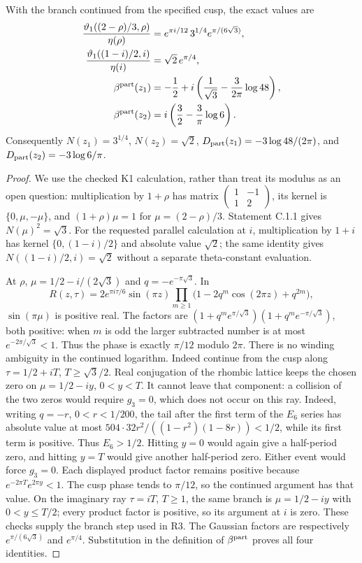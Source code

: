 \begin{proposition}\label{ari:C.1.2}
With the branch continued from the specified cusp, the exact values are
\begin{align*}
 \frac{\vartheta _1((2-\rho)/3,\rho)}{\eta(\rho)}
   &=e^{\pi i/12}\,3^{1/4}e^{\pi/(6\sqrt3)},\\
 \frac{\vartheta _1((1-i)/2,i)}{\eta(i)}
   &=\sqrt2\,e^{\pi/4},\\
 \beta^{\rm part}(z_1)
   &=-\frac12+i\left(\frac1{\sqrt3}-\frac3{2\pi}\log48\right),\\
 \beta^{\rm part}(z_2)
   &=i\left(\frac32-\frac3\pi\log6\right).
\end{align*}
Consequently $N(z_1)=3^{1/4}$, $N(z_2)=\sqrt2$,
$D_{\rm part}(z_1)=-3\log48/(2\pi)$, and
$D_{\rm part}(z_2)=-3\log6/\pi$.
\end{proposition}
\begin{proof}
We use the checked K1 calculation, rather than treat its modulus as an
open question: multiplication by $1+\rho$ has matrix
$\left(\begin{smallmatrix}1&-1\\1&2\end{smallmatrix}\right)$,
its kernel is $\{0,\mu,-\mu\}$, and $(1+\rho)\mu=1$ for
$\mu=(2-\rho)/3$. Statement C.1.1 gives $N(\mu)^2=\sqrt3$.
For the requested parallel calculation at $i$, multiplication by $1+i$
has kernel $\{0,(1-i)/2\}$ and absolute value $\sqrt2$; the same
identity gives $N((1-i)/2,i)=\sqrt2$ without a separate theta-constant
evaluation.

At $\rho$, $\mu=1/2-i/(2\sqrt3)$ and $q=-e^{-\pi\sqrt3}$. In
\[
 R(z,\tau)=2e^{\pi i\tau/6}\sin(\pi z)
 \prod_{m\ge1}\bigl(1-2q^m\cos(2\pi z)+q^{2m}\bigr),
\]
$\sin(\pi\mu)$ is positive real. The factors are
$(1+q^m e^{\pi/\sqrt3})(1+q^m e^{-\pi/\sqrt3})$, both positive:
when $m$ is odd the larger subtracted number is at most
$e^{-2\pi/\sqrt3}<1$. Thus the phase is exactly $\pi/12$ modulo
$2\pi$. There is no winding ambiguity in the continued logarithm.
Indeed continue from the cusp along $\tau=1/2+iT$,
$T\ge\sqrt3/2$. Real conjugation of the rhombic lattice keeps the
chosen zero on $\mu=1/2-iy$, $0<y<T$. It cannot leave that component:
a collision of the two zeros would require $g_3=0$, which does not
occur on this ray. Indeed, writing $q=-r$, $0<r<1/200$,
the tail after the first term of the $E_6$ series has absolute value
at most $504\cdot32r^2/((1-r^2)(1-8r))<1/2$, while its
first term is positive. Thus $E_6>1/2$. Hitting $y=0$ would again give a half-period zero, and
hitting $y=T$ would give another half-period zero. Either event
would force $g_3=0$. Each displayed product factor remains
positive because $e^{-2\pi T}e^{2\pi y}<1$. The cusp phase tends to
$\pi/12$, so the continued argument has that value. On the imaginary
ray $\tau=iT$, $T\ge1$, the same branch is
$\mu=1/2-iy$ with $0<y\le T/2$; every product factor is positive,
so its argument at $i$ is zero. These checks supply the branch step
used in R3. The Gaussian factors are respectively
$e^{\pi/(6\sqrt3)}$ and $e^{\pi/4}$. Substitution in the definition of
$\beta^{\rm part}$ proves all four identities.
\end{proof}


